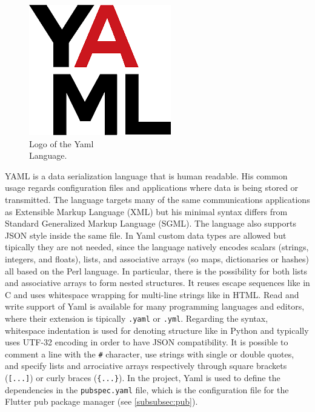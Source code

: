 \begin{figure} %
    \captionsetup{font=footnotesize}
    \centering
    \includegraphics[width=\linewidth]{images/yaml.png}
    \caption{Logo of the Yaml\\Language.}
\end{figure}

YAML is a data serialization language that is human readable. His common usage regards configuration files and applications where data is being stored or transmitted. The language targets many of the same communications applications as Extensible Markup Language (XML) but his minimal syntax differs from Standard Generalized Markup Language (SGML). The language also supports JSON style inside the same file. In Yaml custom data types are allowed but tipically they are not needed, since the language natively encodes scalars (strings, integers, and floats), lists, and associative arrays (so maps, dictionaries or hashes) all based on the Perl language. In particular, there is the possibility for both lists and associative arrays to form nested structures. It reuses escape sequences like in C and uses whitespace wrapping for multi-line strings like in HTML. Read and write support of Yaml is available for many programming languages and editors, where their extension is tipically \texttt{.yaml} or \texttt{.yml}. Regarding the syntax, whitespace indentation is used for denoting structure like in Python and typically uses UTF-32 encoding in order to have JSON compatibility. It is possible to comment a line with the \texttt{\#} character, use strings with single or double quotes, and specify lists and arrociative arrays respectively through square brackets (\texttt{[...]}) or curly braces (\texttt{\{...\}})\cite{Yaml}. In the project, Yaml is used to define the dependencies in the \texttt{pubspec.yaml} file, which is the configuration file for the Flutter pub package manager (see \cref{subsubsec:pub}).

